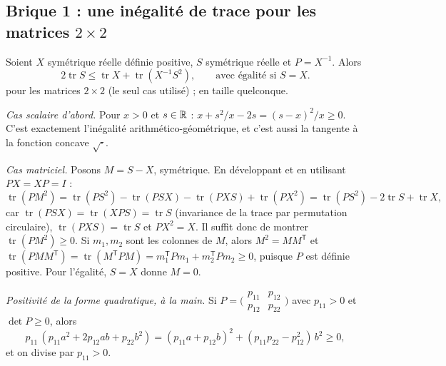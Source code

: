 \subsection{Brique 1 : une inégalité de trace pour les matrices \texorpdfstring{$2\times2$}{2x2}}\label{ch3:sec:trace}
\begin{lemma}\label{ch3:lem:trace}
Soient $X$ symétrique réelle définie positive, $S$ symétrique réelle et $P=X^{-1}$. Alors
\[
2\operatorname{tr}S\le\operatorname{tr}X+\operatorname{tr}(X^{-1}S^2),\qquad\text{avec égalité si }S=X.
\]
\tierAs{} pour les matrices $2\times2$ (le seul cas utilisé) ; \tierC{} en taille quelconque.
\end{lemma}
\begin{humanproof}
\emph{Cas scalaire d'abord.} Pour $x>0$ et $s\in\mathbb{R}$ : $x+s^2/x-2s=(s-x)^2/x\ge0$. C'est exactement l'inégalité
arithmético-géométrique, et c'est aussi la tangente à la fonction concave $\sqrt{\cdot}$.

\emph{Cas matriciel.} Posons $M=S-X$, symétrique. En développant et en utilisant $PX=XP=I$ :
\[
\operatorname{tr}(PM^2)=\operatorname{tr}(PS^2)-\operatorname{tr}(PSX)-\operatorname{tr}(PXS)+\operatorname{tr}(PX^2)
=\operatorname{tr}(PS^2)-2\operatorname{tr}S+\operatorname{tr}X ,
\]
car $\operatorname{tr}(PSX)=\operatorname{tr}(XPS)=\operatorname{tr}S$ (invariance de la trace par permutation
circulaire), $\operatorname{tr}(PXS)=\operatorname{tr}S$ et $PX^2=X$. Il suffit donc de montrer
$\operatorname{tr}(PM^2)\ge0$. Si $m_1,m_2$ sont les colonnes de $M$, alors $M^2=MM^{\mathsf T}$ et
$\operatorname{tr}(PMM^{\mathsf T})=\operatorname{tr}(M^{\mathsf T}PM)=m_1^{\mathsf T}Pm_1+m_2^{\mathsf T}Pm_2\ge0$, puisque
$P$ est définie positive. Pour l'égalité, $S=X$ donne $M=0$.

\emph{Positivité de la forme quadratique, à la main.} Si
$P=\bigl(\begin{smallmatrix}p_{11}&p_{12}\\p_{12}&p_{22}\end{smallmatrix}\bigr)$ avec $p_{11}>0$ et $\det P\ge0$, alors
\[
p_{11}\,(p_{11}a^2+2p_{12}ab+p_{22}b^2)=(p_{11}a+p_{12}b)^2+(p_{11}p_{22}-p_{12}^2)\,b^2\ge0,
\]
et on divise par $p_{11}>0$.
\end{humanproof}

